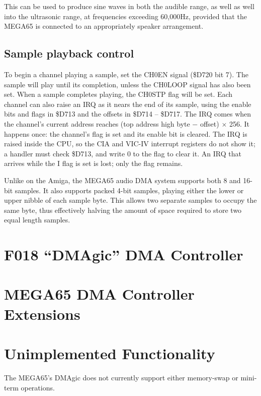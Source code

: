 This can be used to produce sine waves in both the audible range, as
well as well into the ultrasonic range, at frequencies exceeding
60,000Hz, provided that the MEGA65 is connected to an appropriately
speaker arrangement.

\subsection{Sample playback control}

To begin a channel playing a sample, set the CH0EN signal (\$D720 bit
7). The sample will play until its completion, unless the CH0LOOP
signal has also been set. When a sample completes playing, the CH0STP
flag will be set.  Each channel can also raise an IRQ as it nears
the end of its sample, using the enable bits and flags in \$D713 and
the offsets in \$D714 -- \$D717. The IRQ comes when the channel's
current address reaches (top address high byte $-$ offset) $\times$
256. It happens once: the channel's flag is set and its enable bit is
cleared. The IRQ is raised inside the CPU, so the CIA and VIC-IV
interrupt registers do not show it; a handler must check \$D713, and
write 0 to the flag to clear it. An IRQ that arrives while the I flag
is set is lost; only the flag remains.

Unlike on the Amiga\texttrademark{}, the MEGA65 audio DMA system supports both
8 and 16-bit samples.  It also supports packed 4-bit samples, playing
either the lower or upper nibble of each sample byte.  This allows two
separate samples to occupy the same byte, thus effectively halving the
amount of space required to store two equal length samples.

\section{F018 ``DMAgic'' DMA Controller}



\section{MEGA65 DMA Controller Extensions}



\section{Unimplemented Functionality}

The MEGA65's DMAgic does not currently support either memory-swap or
mini-term operations.

